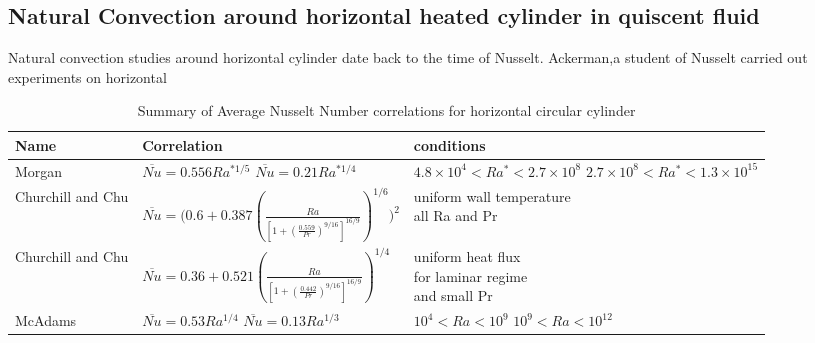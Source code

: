 \subsection{Natural Convection around horizontal heated cylinder in quiscent fluid}
Natural convection studies around horizontal cylinder date back to the time of Nusselt. Ackerman\cite{ack},a student of Nusselt carried out experiments on horizontal
\begin{table}[h!]
\caption{Summary of Average Nusselt Number correlations for horizontal circular cylinder}
\label{tab:correlation}
\begin{center}
\begin{tabular}{|p{3cm}|p{8cm}|p{4.5cm}|}
\hline
Name & Correlation & conditions \\
\hline
\vspace{0.3cm}Morgan & \vspace{0.3cm} \pbox{5cm}{$\overline{Nu} =0.556Ra^{*1/5}$\\$\overline{Nu} =0.21Ra^{*1/4}$\\ \\} &\vspace{0.3cm} \small\pbox{5cm}{ $4.8\times10^4<Ra^*<2.7\times10^8$\\$2.7\times10^8<Ra^*<1.3\times10^{15}$} \\
 
\hline
\vspace{0.3cm}Churchill and Chu & \vspace{0.3cm} \small \pbox{8cm}{$\overline{Nu}=\Bigg(0.6+0.387\left(\frac{Ra}{\left[1+\left(\frac{0.559}{Pr}\right)^{9/16}\right]^{16/9}}\right)^{1/6}\Bigg)^{2}$\\ \\} &\pbox{5cm}{ uniform wall temperature\\all Ra and Pr} \\

\hline
\vspace{0.3cm}Churchill and Chu & \vspace{0.3cm} \small \pbox{7cm}{$\overline{Nu}=0.36+ 0.521\left(\frac{Ra}{\left[1 +\left(\frac{0.442}{Pr}\right)^{9/16}\right]^{16/9}}\right)^{1/4}$\\ \\} &\pbox{5cm}{ uniform heat flux\\for laminar regime \\and small Pr} \\
\hline
\vspace{0.3cm}McAdams & \vspace{0.3cm} \pbox{5cm}{$\overline{Nu} =0.53Ra^{1/4}$\\$\overline{Nu} =0.13Ra^{1/3}$\\ \\} &\vspace{0.3cm} \pbox{5cm}{ $10^4<Ra<10^9$\\$10^9<Ra<10^{12}$} \\
\hline
\end{tabular}
\end{center}
\end{table}
